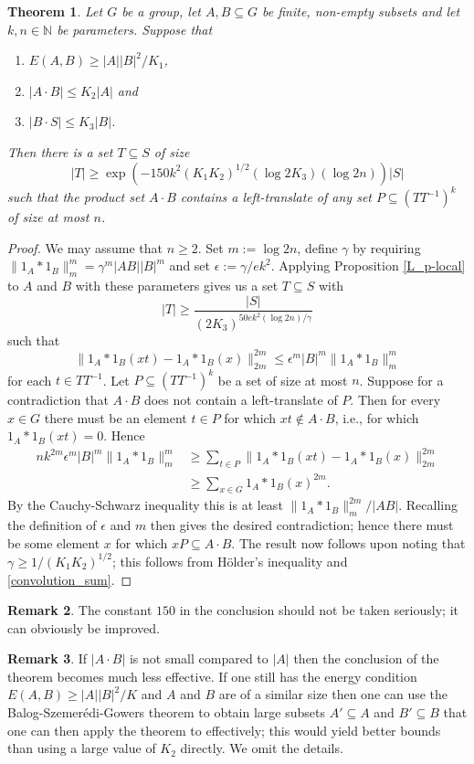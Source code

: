 \documentclass[12pt,a4paper,reqno]{amsart}
\numberwithin{equation}{section}
\theoremstyle{plain}
\newtheorem{theorem}{Theorem}[section]
\theoremstyle{definition}
\newtheorem{remark}[theorem]{Remark}
\renewcommand{\leq}{\leqslant}
\renewcommand{\geq}{\geqslant}
\renewcommand{\subset}{\subseteq}
\def\N{\mathbb{N}}
\providecommand{\norm}[1]{\lVert#1\rVert}
\begin{document}
\begin{theorem}\label{AB-struct-full}
Let $G$ be a group, let $A,B \subset G$ be finite, non-empty subsets and let $k, n \in \N$ be parameters. Suppose that
\begin{enumerate}
\item $E(A,B) \geq |A||B|^2/K_1$,
\item $|A \cdot B| \leq K_2 |A|$ and
\item $|B \cdot S| \leq K_3 |B|$.
\end{enumerate}
Then there is a set $T \subset S$ of size 
\[ |T| \geq \exp\left(-150 k^2 (K_1 K_2)^{1/2} (\log{2K_3}) (\log{2n}) \right)|S| \]
such that the product set $A \cdot B$ contains a left-translate of any set $P \subset (T T^{-1})^k$ of size at most $n$.
\end{theorem}
\begin{proof}
We may assume that $n \geq 2$. Set $m := \log{2n}$, define $\gamma$ by requiring $\norm{ 1_A*1_B }_m^m = \gamma^m |A B| |B|^m$ and set $\epsilon := \gamma/e k^2$. Applying Proposition \ref{L_p-local} to $A$ and $B$ with these parameters gives us a set $T \subset S$ with
\[ |T| \geq \frac{|S|}{(2K_3)^{50e k^2 (\log{2n})/\gamma}} \]
such that
\[ \norm{ 1_A*1_B(xt) - 1_A*1_B(x) }_{2m}^{2m} \leq \epsilon^m |B|^m \norm{ 1_A*1_B }_m^m \]
for each $t \in T T^{-1}$. Let $P \subset (T T^{-1})^k$ be a set of size at most $n$. Suppose for a contradiction that $A \cdot B$ does not contain a left-translate of $P$. Then for every $x \in G$ there must be an element $t \in P$ for which $xt \notin A\cdot B$, i.e., for which $1_A*1_B(xt) = 0$. Hence
\begin{align*}
n k^{2m} \epsilon^m |B|^m \norm{ 1_A*1_B }_m^m &\geq \sum_{t \in P} \norm{ 1_A*1_B(xt) - 1_A*1_B(x) }_{2m}^{2m} \\
&\geq \sum_{x \in G} 1_A*1_B(x)^{2m}.
\end{align*}
By the Cauchy-Schwarz inequality this is at least $\norm{ 1_A*1_B }_m^{2m}/|A B|$. Recalling the definition of $\epsilon$ and $m$ then gives the desired contradiction; hence there must be some element $x$ for which $xP \subset A \cdot B$.
The result now follows upon noting that $\gamma \geq 1/(K_1 K_2)^{1/2}$; this follows from H\"older's inequality and \eqref{convolution_sum}.
\end{proof}
\begin{remark}
The constant $150$ in the conclusion should not be taken seriously; it can obviously be improved.
\end{remark}
\begin{remark}
If $|A \cdot B|$ is not small compared to $|A|$ then the conclusion of the theorem becomes much less effective. If one still has the energy condition $E(A,B) \geq |A||B|^2/K$ and $A$ and $B$ are of a similar size then one can use the Balog-Szemer\'edi-Gowers theorem \cite[Theorem 5.2]{tao:non-comm} to obtain large subsets $A' \subset A$ and $B' \subset B$ that one can then apply the theorem to effectively; this would yield better bounds than using a large value of $K_2$ directly. We omit the details.
\end{remark}
\end{document}

